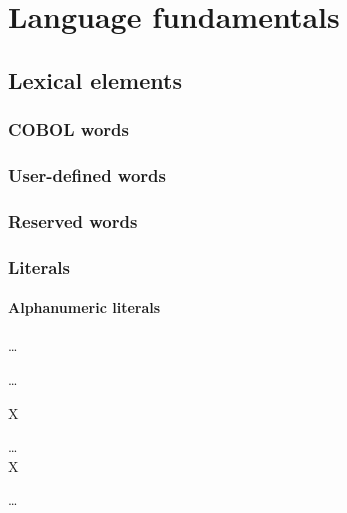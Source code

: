 \chapter{Language fundamentals}

\section{Lexical elements}

\subsection{COBOL words}

\subsection{User-defined words}

\subsection{Reserved words}

\subsection{Literals}

\subsubsection{Alphanumeric literals}

\begin{syntax}
  \begin{1=}
    \textquotesingle
    \begin{0-1}
      \character
    \end{0-1}\ldots
    \textquotesingle \\
    
    \textquotedbl
    \begin{0-1}
      \character
    \end{0-1}\ldots
    \textquotedbl
  \end{1=}
\end{syntax}

\begin{syntax}
  \begin{1=}
    X\textquotesingle
    \begin{0-1}
      \hexcharacter
    \end{0-1}\ldots
    \textquotesingle \\
    
    X\textquotedbl
    \begin{0-1}
      \hexcharacter
    \end{0-1}\ldots
    \textquotedbl
  \end{1=}  
\end{syntax}

